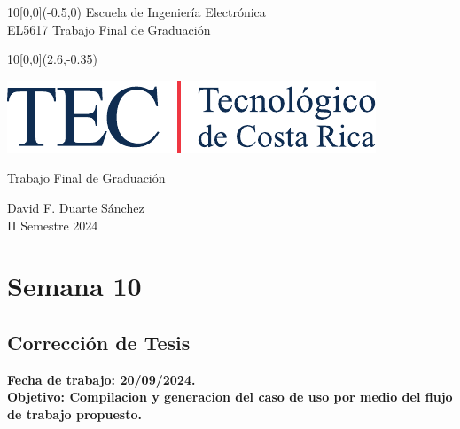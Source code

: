 \documentclass[12pt,letterpaper]{article}
\newcommand{\EstudianteA}{David F. Duarte Sánchez}
\begin{document}
	
\graphicspath{{./}{./fig/}}


%
\begin{textblock}{10}[0,0](-0.5,0)
	\large Escuela de Ingeniería Electrónica \\ 
	EL5617 Trabajo Final de Graduación \\
\end{textblock}

%
\begin{textblock}{10}[0,0](2.6,-0.35)
	\begin{flushright}
		\includegraphics[scale=0.8]{Firma_TEC-4.pdf}
	\end{flushright}
\end{textblock}

\begin{center}
	\vspace{70mm}
	{\large\color{tecRojo} Trabajo Final de Graduación}
	\par\vspace{8mm}
	{\Large\bf\color{tecAzul}{Bitácora de Trabajo - Entrega 5}}
	\par\vspace{100mm}
	{{\EstudianteA \\ II Semestre 2024} 
	\vspace{8mm}}
\end{center}

\newpage

\renewcommand{\baselinestretch}{1.1}    %


\section{Semana 10}
\subsection{Corrección de Tesis}

\bf{Fecha de trabajo:} 20/09/2024.\\
\bf{Objetivo:} Compilacion y generacion del caso de uso por medio del flujo de trabajo propuesto.
\end{document}

